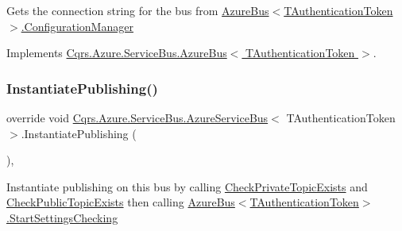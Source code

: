 Gets the connection string for the bus from \hyperlink{classCqrs_1_1Azure_1_1ServiceBus_1_1AzureBus_aaf9469d220fb23cb0521fa76b25ab228_aaf9469d220fb23cb0521fa76b25ab228}{Azure\+Bus$<$\+T\+Authentication\+Token$>$.\+Configuration\+Manager} 



Implements \hyperlink{classCqrs_1_1Azure_1_1ServiceBus_1_1AzureBus_a514e371d5ce093678365af31e6c274e3_a514e371d5ce093678365af31e6c274e3}{Cqrs.\+Azure.\+Service\+Bus.\+Azure\+Bus$<$ T\+Authentication\+Token $>$}.

\mbox{\label{classCqrs_1_1Azure_1_1ServiceBus_1_1AzureServiceBus_a5c286d29b0bbfe3770f3407efda57036_a5c286d29b0bbfe3770f3407efda57036}} 
\subsubsection{\texorpdfstring{Instantiate\+Publishing()}{InstantiatePublishing()}}
{\footnotesize\ttfamily override void \hyperlink{classCqrs_1_1Azure_1_1ServiceBus_1_1AzureServiceBus}{Cqrs.\+Azure.\+Service\+Bus.\+Azure\+Service\+Bus}$<$ T\+Authentication\+Token $>$.Instantiate\+Publishing (\begin{DoxyParamCaption}{ }\end{DoxyParamCaption})\hspace{0.3cm}{\ttfamily [protected]}, {\ttfamily [virtual]}}



Instantiate publishing on this bus by calling \hyperlink{classCqrs_1_1Azure_1_1ServiceBus_1_1AzureServiceBus_add2d99ff99f1af5470082b1de340c04a_add2d99ff99f1af5470082b1de340c04a}{Check\+Private\+Topic\+Exists} and \hyperlink{classCqrs_1_1Azure_1_1ServiceBus_1_1AzureServiceBus_aae464d1d93ae6600ff5ace028160dd3c_aae464d1d93ae6600ff5ace028160dd3c}{Check\+Public\+Topic\+Exists} then calling \hyperlink{classCqrs_1_1Azure_1_1ServiceBus_1_1AzureBus_acb7f47329c17646805545e78d0776efe_acb7f47329c17646805545e78d0776efe}{Azure\+Bus$<$\+T\+Authentication\+Token$>$.\+Start\+Settings\+Checking} 



